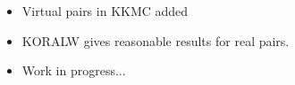 \documentclass[dvips,portrait]{seminar}             %
\begin{document}
\def\title{\Color{PineGreen} Pairs KKMC+KoralW}
\begin{slide*}                                                %

{\LARGE\bf{}
\begin{itemize}
\item Virtual pairs in KKMC added
\item KORALW gives reasonable results for real pairs.
\item Work in progress...
\end{itemize}}


\vfill
\end{slide*}   %
\end{document}
